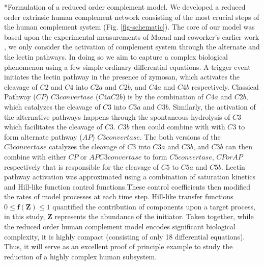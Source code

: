 \documentclass[12pt]{article}
\makeatletter
\renewcommand\subsection{\@startsection
	{subsection}{2}{0mm}
	{-0.05in}
	{-0.5\baselineskip}
	{\normalfont\normalsize\bfseries}}
\makeatother
\begin{document}
\subsection*{Formulation of a reduced order complement model.}
We developed a reduced order extrinsic human complement network consisting of the most crucial steps of the human complement system (Fig. \ref{fig-schematic}). The core of our model was based upon the experimental measurements of Morad and coworker's earlier work \cite{morad2015time}, we only consider the activation of complement system through the alternate and the lectin pathways. In doing so we aim to capture a complex biological phenomenon using a few simple ordinary differential equations.  A trigger event initiates the lectin pathway in the presence of zymosan, which activates the cleavage of $C2$ and $C4$ into $C2a$ and $C2b$, and $C4a$ and $C4b$ respectively. Classical Pathway ($CP$) $C3 convertase$ ($C4aC2b$) is by the combination of $C4a$ and $C2b$, which catalyzes the cleavage of $C3$ into $C3a$ and $C3b$. Similarly, the activation of the alternative pathways happens through the spontaneous hydrolysis of $C3$ which facilitates the cleavage of $C3$. $C3b$ then could combine with with $C3$ to form alternate pathway ($AP$) $C3 convertase$. The both  versions of the $C3 convertase$ catalyzes the cleavage of $C3$ into $C3a$ and $C3b$, and $C3b$ can then combine with either $CP$ or $AP C3 convertase$ to form $C5 convertase$, $CP or AP$ respectively that is responsible for the cleavage of $C5$ to $C5a$ and $C5b$. Lectin pathway activation was approximated using a combination of saturation kinetics and Hill-like function control functions.These control coefficients then modified the rates of model processes at each time step. Hill-like transfer functions $0 \le \mathbf{f (Z)}  \le 1$ quantified the contribution of components upon a target process, in this study, $\mathbf{Z}$ represents the abundance of the initiator. Taken together, while the reduced order human complement model encodes significant biological complexity, it is highly compact (consisting of only 18 differential equations). Thus, it will serve as an excellent proof
of principle example to study the reduction of a highly complex human subsystem.
\end{document}
